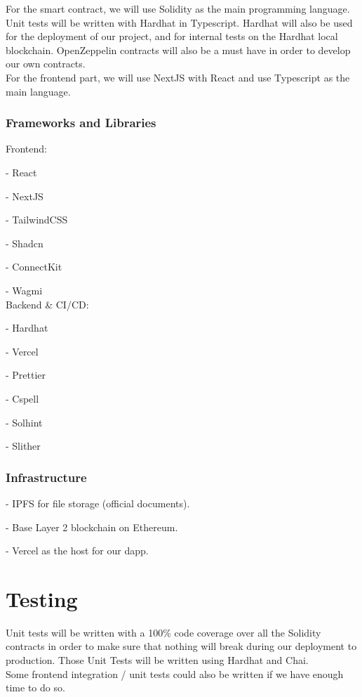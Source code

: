 \documentclass[a4paper, 12pt]{article}
\begin{document}
For the smart contract, we will use Solidity as the main programming language. Unit tests will be written with Hardhat in Typescript. Hardhat will also be used for the deployment of our project, and for internal tests on the Hardhat local blockchain. OpenZeppelin contracts will also be a must have in order to develop our own contracts.\\

For the frontend part, we will use NextJS with React and use Typescript as the main language.

\subsubsection{Frameworks and Libraries}

Frontend:

- React

- NextJS

- TailwindCSS

- Shadcn

- ConnectKit

- Wagmi\\

Backend \& CI/CD:

- Hardhat

- Vercel

- Prettier

- Cspell

- Solhint

- Slither


\subsubsection{Infrastructure}

- IPFS for file storage (official documents).

- Base Layer 2 blockchain on Ethereum.

- Vercel as the host for our dapp.


\section{Testing}

Unit tests will be written with a 100\% code coverage over all the Solidity contracts in order to make sure that nothing will break during our deployment to production. Those Unit Tests will be written using Hardhat and Chai.\\

Some frontend integration / unit tests could also be written if we have enough time to do so.
\end{document}
